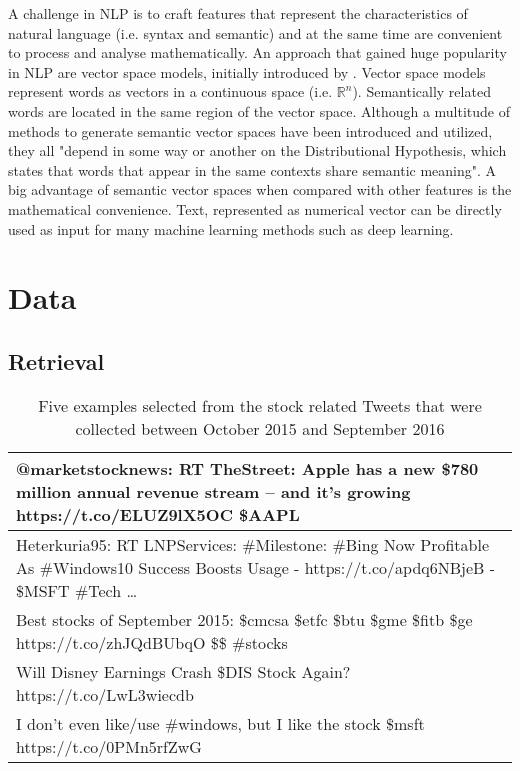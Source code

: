 \documentclass[a4paper,12pt]{article}%
\begin{document}
A challenge in NLP is to craft features that represent the characteristics of natural language (i.e. syntax and semantic) and at the same time are convenient to process and analyse mathematically. An approach that gained huge popularity in NLP are vector space models, initially introduced by \citet{Salton1975}. Vector space models represent words as vectors in a continuous space (i.e. $\mathbb{R}^n$). Semantically related words are located in the same region of the vector space. Although a multitude of methods to generate semantic vector spaces have been introduced and utilized, they all "depend in some way or another on the Distributional Hypothesis, which states that words that appear in the same contexts share semantic meaning". A big advantage of semantic vector spaces when compared with other features is the mathematical convenience. Text, represented as numerical vector can be directly used as input for many machine learning methods such as deep learning. 


\section{Data}
\subsection{Retrieval}


\begin{table}
\centering
\captionsetup{justification=centering}
\begin{tabular}{|p{\textwidth}|}
\hline
@marketstocknews: RT TheStreet: Apple has a new \$780 million annual revenue stream -- and it's growing https://t.co/ELUZ9lX5OC  \$AAPL \\ \hline

Heterkuria95: RT LNPServices: \#Milestone: \#Bing Now Profitable As \#Windows10 Success Boosts Usage - https://t.co/apdq6NBjeB - \$MSFT \#Tech … \\ \hline

Best stocks of September 2015: \$cmcsa \$etfc \$btu \$gme \$fitb \$ge https://t.co/zhJQdBUbqO \$\$ \#stocks \\ \hline

Will Disney Earnings Crash \$DIS Stock Again? https://t.co/LwL3wiecdb \\ \hline

I don't even like/use \#windows, but I like the stock \$msft https://t.co/0PMn5rfZwG \\ \hline

\end{tabular}
\caption{Five examples selected from the stock related Tweets that were collected between October 2015 and September 2016 \label{table:weet_examples}}
\end{table}
\end{document}
